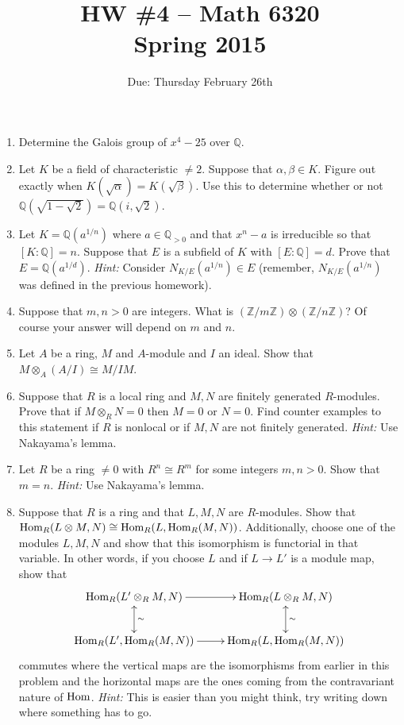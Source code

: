 \documentclass[11pt]{amsart}
\theoremstyle{theorem}
\renewcommand{\to}[1][]{\xrightarrow{\ #1\ }}
\newcommand{\bQ}{\mathbb{Q}}
\newcommand{\bZ}{\mathbb{Z}}
\newcommand{\Hom}{\textnormal{Hom}}
\begin{document}
\title{HW \#4 -- Math 6320\\Spring 2015}
\author{Due: Thursday February 26th}
\maketitle

\begin{enumerate}
\item Determine the Galois group of $x^4-25$ over $\bQ$.
\item Let $K$ be a field of characteristic $\neq 2$.  Suppose that $\alpha, \beta \in K$.  Figure out exactly when $K(\sqrt{\alpha}) = K(\sqrt{\beta})$.  Use this to determine whether or not $\bQ(\sqrt{1 - \sqrt{2}}) = \bQ(i, \sqrt{2})$.
\item Let $K = \bQ(a^{1/n})$ where $a \in \bQ_{> 0}$ and that $x^n - a$ is irreducible so that $[K : \bQ] = n$.  Suppose that $E$ is a subfield of $K$ with $[E : \bQ] = d$.  Prove that $E = \bQ(a^{1/d})$.  
    \vskip 3pt
    \emph{Hint:} Consider $N_{K/E}(a^{1/n}) \in E$ (remember, $N_{K/E}(a^{1/n})$ was defined in the previous homework).
\item  Suppose that $m, n > 0$ are integers.  What is $(\bZ/m\bZ) \otimes (\bZ/n\bZ)$?  Of course your answer will depend on $m$ and $n$.
\item  Let $A$ be a ring, $M$ and $A$-module and $I$ an ideal.  Show that $M \otimes_A (A/I) \cong M/IM$.  
\item  Suppose that $R$ is a local ring and $M, N$ are finitely generated $R$-modules.  Prove that if $M \otimes_R N = 0$ then $M = 0$ or $N = 0$.  Find counter examples to this statement if $R$ is nonlocal or if $M, N$ are not finitely generated.
    \vskip 3pt
    \emph{Hint:} Use Nakayama's lemma.
\item Let $R$ be a ring $\neq 0$ with $R^{n} \cong R^{m}$ for some integers $m,n > 0$.  Show that $m = n$.
    \vskip 3pt
    \emph{Hint:}  Use Nakayama's lemma.
\item Suppose that $R$ is a ring and that $L, M, N$ are $R$-modules.  Show that $\Hom_R(L \otimes M, N) \cong \Hom_R(L, \Hom_R(M, N))$.  Additionally, choose one of the modules $L, M, N$ and show that this isomorphism is functorial in that variable.  In other words, if you choose $L$ and if $L \to L'$ is a module map, show that
    \[
    \xymatrix{
        \Hom_R(L' \otimes_R M, N) \ar[r] \ar@{<->}[d]^{\sim} & \Hom_R(L \otimes_R M, N) \ar@{<->}[d]^{\sim}  \\
        \Hom_R(L', \Hom_R(M, N)) \ar[r] & \Hom_R(L, \Hom_R(M, N))
    }
    \]
    commutes where the vertical maps are the isomorphisms from earlier in this problem and the horizontal maps are the ones coming from the contravariant nature of $\Hom$.  
    \vskip 3pt
    \emph{Hint:}  This is easier than you might think, try writing down where something has to go.
\end{enumerate}
\end{document}
